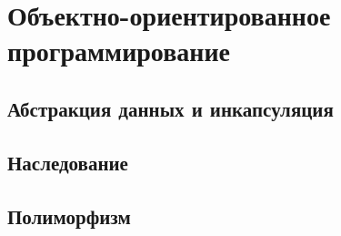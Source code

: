 \chapter{Объектно-ориентированное программирование}

\section{Абстракция данных и инкапсуляция}

\section{Наследование}

\section{Полиморфизм}
